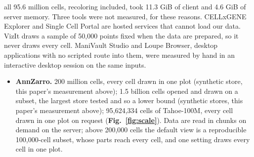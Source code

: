 \documentclass[11pt]{article}
\begin{document}
all 95.6 million cells, recoloring included, took 11.3 GiB of client and 4.6 GiB of server memory. Three tools were not measured, for these reasons. CELLxGENE Explorer and Single Cell Portal are hosted services that cannot load our data. VizIt draws a sample of 50,000 points fixed when the data are prepared, so it never draws every cell. ManiVault Studio and Loupe Browser, desktop applications with no scripted route into them, were measured by hand in an interactive desktop session on the same inputs.

\begin{itemize}[nosep]
\item \textbf{AnnZarro.} 200 million cells, every cell drawn in one plot (synthetic store, this paper's measurement above); 1.5 billion cells opened and drawn on a subset, the largest store tested and so a lower bound (synthetic stores, this paper's measurement above); 95,624,334 cells of Tahoe-100M, every cell drawn in one plot on request (\textbf{Fig.~\ref{fig:scale}}). Data are read in chunks on demand on the server; above 200,000 cells the default view is a reproducible 100,000-cell subset, whose parts reach every cell, and one setting draws every cell in one plot.

\end{itemize}
\end{document}
